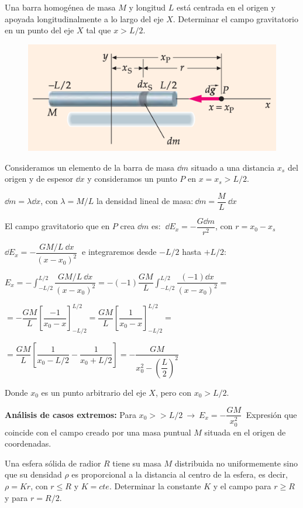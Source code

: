 \begin{prob}
Una barra homogénea de masa $M$ y longitud $L$ está centrada en el origen y apoyada longitudinalmente a lo largo del eje $X$. Determinar el campo gravitatorio en un punto del eje $X$ tal que $x>L/2$. 	
\end{prob}

\begin{figure}[H]
	\centering
	\includegraphics[width=.9\textwidth]{imagenes/imagenes15/T15IM11.png}
\end{figure}

Consideramos un elemento de la barra de masa $\dd m$ situado a una distancia $x_s$ del origen y de espesor $\dd x$ y consideramos un punto $P$ en $x=x_s>L/2$.

$\dd m = \lambda \dd x$, con $\lambda=M/L$ la densidad lineal de masa:$\ \dd m =\dfrac M L \ \dd x$

El campo gravitatorio que en $P$ crea $\dd m$ es: $\ \dd E_x=-\dfrac{G\dd m}{r^2}$, con $r=x_0-x_s$

$\dd E_x=-\dfrac{GM/L\ \dd x}{(x-x_0)^2}\ $ e integraremos desde $-L/2$ hasta $+L/2$:

$E_x=-\displaystyle \int_{-L/2}^{L/2} \dfrac{GM/L\ \dd x}{(x-x_0)^2} = -(-1)\dfrac{GM}{L} \int_{-L/2}^{L/2} \dfrac{(-1) \dd x}{(x-x_0)^2}= $

$\displaystyle =- \dfrac{GM}{L} \left[ \dfrac {-1} {x_0-x}  \right]_{-L/2}^{L/2} = \dfrac{GM}{L} \left[ \dfrac 1 {x_0-x}  \right]_{-L/2}^{L/2}=$

$\displaystyle = \dfrac{GM}{L} \left[ \dfrac{1}{x_0-L/2}-\dfrac{1}{x_0+L/2} \right] = -\dfrac{GM}{x_0^2-\left(\dfrac L 2 \right)^2}$

Donde $x_0$ es un punto arbitrario del eje $X$, pero con $x_0>L/2$.

\textbf{Análisis de casos extremos: } Para $x_0>>L/2 \ \to \ E_x=-\dfrac{GM}{x_0^2}\ $ Expresión que coincide con el campo creado por una masa puntual $M$ situada en el origen de coordenadas.

\begin{prob}
Una esfera sólida de radior $R$ tiene su masa $M$ distribuida no uniformemente sino que su densidad $\rho$ es proporcional a la distancia al centro de la esfera, es decir, $\rho=Kr$, con $r\leq R$ y $K=cte$. Determinar la constante $K$ y el campo para $r\geq R$ y para $r=R/2$.
\end{prob}

